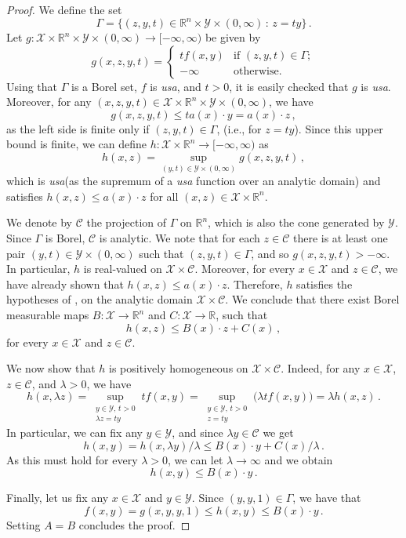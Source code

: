 \documentclass[10pt, a4paper]{article}
\newcommand{\R}{\mathbb R}
\newcommand{\usa}{\emph{usa}\xspace}
\newcommand{\X}{\mathcal X}
\newcommand{\Y}{\mathcal Y}
\begin{document}
\begin{proof}
We define the set
    $$\Gamma = \bigl\{(z, y, t) \in \R^n \times \Y \times (0,\infty) \,:\, z = ty\bigr\}\,.$$
Let $g: \X \times \R^n \times \Y \times (0,\infty) \to [-\infty, \infty)$ be given by
$$g(x, z, y, t) = \begin{cases}
    tf(x,y) & \text{if } (z, y, t) \in \Gamma; \\
    -\infty & \text{otherwise.}
\end{cases}$$
Using that $\Gamma$ is a Borel set, $f$ is \usa, and $t > 0$,  it is easily checked that $g$ is \usa.
Moreover, for any $(x, z, y, t) \in \X \times \R^n \times \Y \times (0,\infty)$, we have $$g(x, z, y, t) \leq ta(x)\cdot y = a(x)\cdot z\,,$$
as the left side is finite only if $(z, y, t) \in \Gamma$, (i.e., for $z = ty$). Since this upper bound is finite, we can define $h: \X \times \R^n \to [-\infty, \infty)$ as
$$h(x,z) = \sup_{(y,t) \in \Y \times (0,\infty)} g(x, z, y, t)\,,$$
which is \usa (as the supremum of a \usa function over an analytic domain) and satisfies $h(x,z) \leq a(x)\cdot z$ for all $(x,z) \in \X \times \R^n$. 

We denote by $\mathcal C$ the projection of $\Gamma$ on $\R^n$, which is also the cone generated by $\Y$. Since $\Gamma$ is Borel, $\mathcal C$ is analytic. We note that for each $z \in \mathcal{C}$ there is at least one pair $(y,t)\in\Y\times(0,\infty)$ such that $(z,y,t)\in\Gamma$, and so $g(x,z,y, t)>-\infty$. In particular, $h$ is real-valued on $\X \times \mathcal{C}$. Moreover, for every $x\in\X$ and $z\in\mathcal C$, we have already shown that $h(x,z)\le a(x)\cdot z$. Therefore, $h$ satisfies the hypotheses of , on the analytic domain $\X\times\mathcal C$. We conclude that there exist Borel measurable maps $B:\X\to\R^n$ and $C:\X\to\R$, such that
$$h(x,z)\le B(x)\cdot z + C(x)\,,$$
for every $x\in\X$ and $z\in\mathcal C$.

We now show that $h$ is positively homogeneous on $\X\times\mathcal C$. Indeed, for any $x\in\X$, $z\in\mathcal C$, and $\lambda>0$, we have
$$h(x,\lambda z) = \sup_{\substack{y\in\Y,\,t>0\\ \lambda z = ty}} tf(x,y)
= \sup_{\substack{y\in\Y,\,t>0\\z = ty}} \big(\lambda tf(x,y)\big) = \lambda h(x,z)\,.$$
In particular, we can fix any $y\in\Y$, and since $\lambda y\in\mathcal C$ we get
$$h(x,y)=h(x,\lambda y)/\lambda\leq B(x)\cdot y + C(x)/\lambda\,.$$
As this must hold for every $\lambda>0$, we can let $\lambda\to\infty$ and we obtain
$$h(x,y)\le B(x)\cdot y\,.$$

Finally, let us fix any $x\in\X$ and $y\in\Y$. Since $(y,y,1)\in\Gamma $, we have that
$$f(x,y) = g(x,y,y,1) \leq h(x,y) \leq B(x)\cdot y\,.$$
Setting $A = B$ concludes the proof.
\end{proof}
\end{document}
